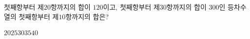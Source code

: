 첫째항부터 제$20$항까지의 합이 $120$이고, 첫째항부터 제$30$항까지의 합이 $300$인 등차수열의 첫째항부터 제$10$항까지의 합은?
\begin{choices32}{$20$}{$25$}{$30$}{$35$}{$40$}\end{choices32}
